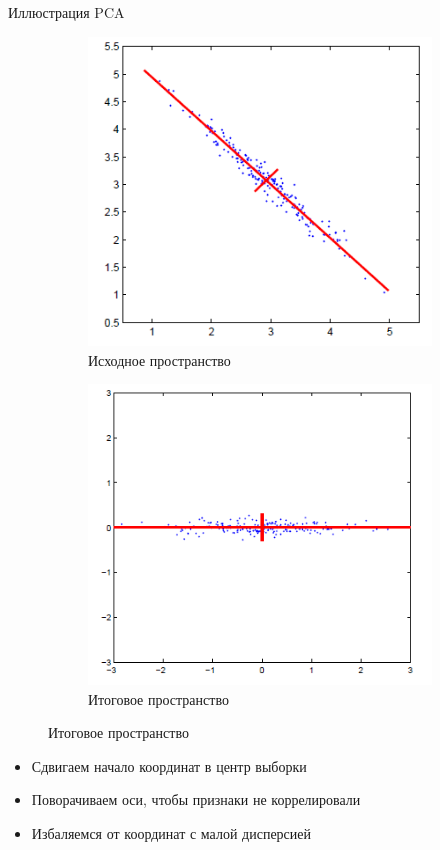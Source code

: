 \documentclass[10pt]{beamer}
\begin{document}
\begin{frame}{Иллюстрация PCA}
\begin{figure}
    \centering
    \begin{subfigure}[b]{0.45\textwidth}
        \includegraphics[width=\textwidth]{images/pcasource.png}
    \caption{Исходное пространство}  
    \end{subfigure}
    \begin{subfigure}[b]{0.45\textwidth}
        \includegraphics[width=\textwidth]{images/pcaout.png}
    \caption{Итоговое пространство}
    \end{subfigure}
\end{figure}
\begin{itemize}
    \item Сдвигаем начало координат в центр выборки
    \item Поворачиваем оси, чтобы признаки не коррелировали
    \item Избаляемся от координат с малой дисперсией
\end{itemize}
\end{frame}
\end{document}
